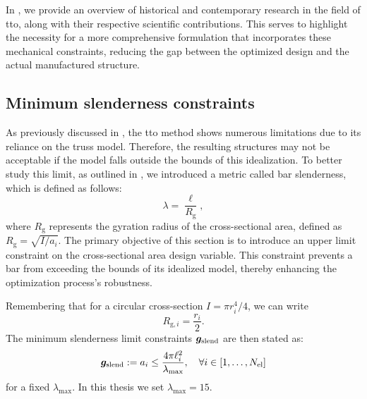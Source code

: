 In , we provide an overview of historical and contemporary research in the field of \gls{tto}, along with their respective scientific contributions. This serves to highlight the necessity for a more comprehensive formulation that incorporates these mechanical constraints, reducing the gap between the optimized design and the actual manufactured structure.
    
\subsection{Minimum slenderness constraints}
As previously discussed in , the \gls{tto} method shows numerous limitations due to its reliance on the truss model. Therefore, the resulting structures may not be acceptable if the model falls outside the bounds of this idealization. To better study this limit, as outlined in , we introduced a metric called bar slenderness, which is defined as follows:
\begin{equation}
    \lambda = \frac{\ell}{R_{\mathrm{g}}},
\end{equation}
where $R_{\mathrm{g}}$ represents the gyration radius of the cross-sectional area, defined as $R_{\mathrm{g}} = \sqrt{I/a_i}$.
The primary objective of this section is to introduce an upper limit constraint on the cross-sectional area design variable. This constraint prevents a bar from exceeding the bounds of its idealized model, thereby enhancing the optimization process's robustness.

Remembering that for a circular cross-section $I = \pi r_i^4/4$, we can write
\begin{equation}
    R_{\mathrm{g},i} = \frac{r_i}{2}.
\end{equation}
The minimum slenderness limit constraints $\bm{g}_{\text{slend}}$ are then stated as:
\begin{equation} \label{eq:04_slend_constraints}
    \bm{g}_{\text{slend}}:=a_i \leq \frac{4 \pi \ell_i^2}{\lambda_{\text{max}}}, \quad \forall i \in [1,\ldots, N_{\text{el}}]
\end{equation}
for a fixed $\lambda_{\text{max}}$. In this thesis we set $\lambda_{\text{max}}=15$.

